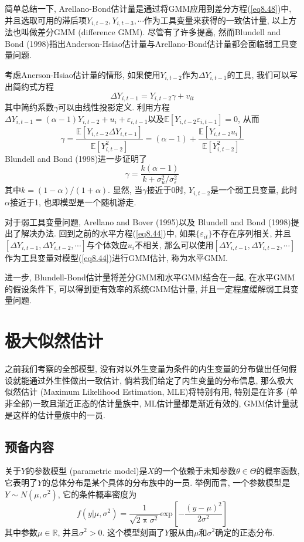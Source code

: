 \documentclass[cn, 12pt, math=mtpro2, bibstyle=apa, blue, twocol]{elegantbook}
\newcommand{\R}{\mathbb{R}}
\newcommand{\E}{\mathbb{E}}
\begin{document}
简单总结一下, Arellano-Bond估计量是通过将GMM应用到差分方程(\ref{eq8.48})中, 并且选取可用的滞后项$Y_{i,t-2},Y_{i,t-3},\cdots$作为工具变量来获得的一致估计量, 以上方法也叫做差分GMM (difference GMM). 尽管有了许多提高, 然而Blundell and Bond (1998)指出Anderson-Hsiao估计量与Arellano-Bond估计量都会面临弱工具变量问题.

考虑Anerson-Hsiao估计量的情形, 如果使用$Y_{i,t-2}$作为$\Delta Y_{i,t-1}$的工具, 我们可以写出简约式方程
$$\Delta Y_{i,t-1}=Y_{i,t-2}\gamma+v_{it}$$
其中简约系数$\gamma$可以由线性投影定义. 利用方程$\Delta Y_{i,t-1}=(\alpha-1)Y_{i,t-2}+u_i+\varepsilon_{i,t-1}$以及$\E[Y_{i,t-2}\varepsilon_{i,t-1}]=0$, 从而
$$\gamma=\frac{\E[Y_{i,t-2}\Delta Y_{i,t-1}]}{\E[Y_{i,t-2}^2]}=(\alpha-1)+\frac{\E[Y_{i,t-2}u_i]}{\E[Y_{i,t-2}^2]}$$
Blundell and Bond (1998)进一步证明了
$$\gamma=\frac{k(\alpha-1)}{k+\sigma_u^2/\sigma_\varepsilon^2}$$
其中$k=(1-\alpha)/(1+\alpha)$. 显然, 当$\gamma$接近于0时, $Y_{i,t-2}$是一个弱工具变量, 此时$\alpha$接近于1, 也即模型是一个随机游走.

对于弱工具变量问题, Arellano and Bover (1995)以及 Blundell and Bond (1998)提出了解决办法. 回到之前的水平方程(\ref{eq8.44})中, 如果$\{\varepsilon_{it}\}$不存在序列相关, 并且$[\Delta Y_{i,t-1},\Delta Y_{i,t-2},\cdots]$与个体效应$u_i$不相关, 那么可以使用$[\Delta Y_{i,t-1},\Delta Y_{i,t-2},\cdots]$作为工具变量对模型(\ref{eq8.44})进行GMM估计, 称为水平GMM.

进一步, Blundell-Bond估计量将差分GMM和水平GMM结合在一起, 在水平GMM的假设条件下, 可以得到更有效率的系统GMM估计量, 并且一定程度缓解弱工具变量问题.
\chapter{极大似然估计}
之前我们考察的全部模型, 没有对以外生变量为条件的内生变量的分布做出任何假设就能通过外生性做出一致估计, 倘若我们给定了内生变量的分布信息, 那么极大似然估计 (Maximum Likelihood Estimation, MLE)将特别有用, 特别是在许多 (单非全部)一致且渐近正态的估计量族中, ML估计量都是渐近有效的, GMM估计量就是这样的估计量族中的一员.
\section{预备内容}

关于$Y$的参数模型 (parametric model)是$X$的一个依赖于未知参数$\theta\in\Theta$的概率函数, 它表明了$Y$的总体分布是某个具体的分布族中的一员. 举例而言, 一个参数模型是$Y\sim N(\mu,\sigma^2)$, 它的条件概率密度为
$$f(y|\mu,\sigma^2)=\frac{1}{\sqrt{2\uppi\sigma^2}}\text{exp}\left[{-\frac{(y-\mu)^2}{2\sigma^2}}\right]$$
其中参数$\mu\in\R$, 并且$\sigma^2>0$. 这个模型刻画了$Y$服从由$\mu$和$\sigma^2$确定的正态分布.
\end{document}

